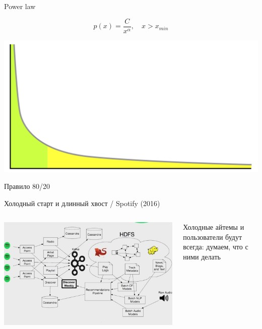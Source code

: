 \documentclass[11pt,aspectratio=169]{beamer}
\begin{document}
\begin{frame}{Power law}

\[
p(x) = \frac{C} {x^{\alpha}}, \quad x > x_{min}
\]

\begin{center}
\includegraphics[scale=0.25]{images/longtail.png}

Правило 80/20
\end{center}

\end{frame}

\begin{frame}{Холодный старт и длинный хвост / Spotify (2016) \cite{SPTF}}
\begin{columns}
\begin{column}{0.6\textwidth}
   \begin{center}
		\includegraphics[scale=0.31]{images/spotify.jpeg}
   \end{center}
\end{column}
\begin{column}{0.3\textwidth}
    \begin{tcolorbox}[colback=info!5,colframe=info!80,title=]
    Холодные айтемы и пользователи будут всегда: думаем, что с ними делать
    \end{tcolorbox}
\end{column}
\end{columns}

\end{frame}
\end{document}
